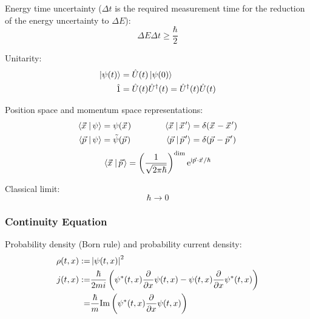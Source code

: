 		\noindent
		Energy time uncertainty ($\Delta t$ is the required measurement time for the reduction of the energy uncertainty to $\Delta E$):
		\begin{equation}
			\Delta E \Delta t \ge \frac{\hbar}{2}
		\end{equation}

		\noindent
		Unitarity:
		\begin{equation}
			\begin{aligned}
				\Ket{\psi(t)} &= \hat{U}(t) \Ket{\psi(0)} \\
				\hat{1} &= \hat{U}(t)\hat{U}^\dagger(t) = \hat{U}^\dagger(t)\hat{U}(t) \\
			\end{aligned}
		\end{equation}

		\noindent
		Position space and momentum space representations:
		\begin{equation}
			\begin{aligned}
				\Braket{\vec{x} | \psi} &= \psi(\vec{x}) &\hsp
				\Braket{\vec{x} | \vec{x}'} &= \delta(\vec{x} - \vec{x}') \\
				\Braket{\vec{p} | \psi} &= \tilde{\psi}(\vec{p}) &\hsp
				\Braket{\vec{p} | \vec{p}'} &= \delta(\vec{p} - \vec{p}') \\
			\end{aligned}
		\end{equation}
		\begin{equation}
			\begin{aligned}
				\Braket{\vec{x} | \vec{p}} &= \left( \frac{1}{\sqrt{2\pi\hbar}} \right)^\mathrm{dim} \ex^{\i \vec{p}\cdot\vec{x} / \hbar} \\
			\end{aligned}
		\end{equation}

		\noindent
		Classical limit:
		\begin{equation}
			\hbar \rightarrow 0
		\end{equation}

		\subsubsection{Continuity Equation}
			\noindent
			Probability density (Born rule) and probability current density:
			\begin{equation}
				\begin{aligned}
					\rho(t,x) :=& \left|\psi(t,x)\right|^2 \\
					j(t,x) :=& \frac{\hbar}{2mi}\left(
						\psi^*(t,x)\pdv{x}\psi(t,x) - \psi(t,x)\pdv{x}\psi^*(t,x)
					\right) \\
					=& \frac{\hbar}{m} \mathrm{Im}\left(
						\psi^*(t,x) \pdv{x}\psi(t,x)
					\right)\\
				\end{aligned}
			\end{equation}

